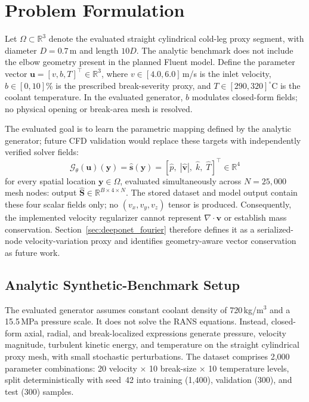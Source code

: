 \documentclass[journal]{IEEEtran}
\newcommand{\added}[1]{#1}
\begin{document}
\section{Problem Formulation}
\label{sec:problem}

\added{Let $\Omega \subset \mathbb{R}^3$ denote the evaluated straight cylindrical cold-leg proxy segment, with diameter $D = 0.7$\,m and length $10D$. The analytic benchmark does not include the elbow geometry present in the planned Fluent model.} Define the parameter vector $\bm{u} = [v, b, T]^\top \in \mathbb{R}^3$, where $v \in [4.0, 6.0]$\,m/s is the inlet velocity, $b \in [0, 10]$\% is the \added{prescribed break-severity proxy}, and $T \in [290, 320]^\circ$C is the coolant temperature. \added{In the evaluated generator, $b$ modulates closed-form fields; no physical opening or break-area mesh is resolved.}

\added{The evaluated goal is to learn the parametric mapping defined by the analytic generator; future CFD validation would replace these targets with independently verified solver fields:}
\begin{equation}
\mathcal{G}_\theta(\bm{u})(\bm{y}) = \hat{\bm{s}}(\bm{y}) = [\hat{p},\; |\hat{\bm{v}}|,\; \hat{k},\; \hat{T}]^\top \in \mathbb{R}^4
\label{eq:operator}
\end{equation}
for every spatial location $\bm{y} \in \Omega$, evaluated simultaneously across $N = 25{,}000$ mesh nodes: output $\hat{\bm{S}} \in \mathbb{R}^{B \times 4 \times N}$.  \added{The stored dataset and model output contain these four scalar fields only; no $(v_x,v_y,v_z)$ tensor is produced. Consequently, the implemented velocity regularizer cannot represent $\nabla\!\cdot\!\bm v$ or establish mass conservation. Section~\ref{sec:deeponet_fourier} therefore defines it as a serialized-node velocity-variation proxy and identifies geometry-aware vector conservation as future work.}

\subsection{Analytic Synthetic-Benchmark Setup}

\added{The evaluated generator assumes constant coolant density of 720\,kg/m$^3$ and a 15.5\,MPa pressure scale. It does not solve the RANS equations. Instead, closed-form axial, radial, and break-localized expressions generate pressure, velocity magnitude, turbulent kinetic energy, and temperature on the straight cylindrical proxy mesh, with small stochastic perturbations. The dataset comprises 2,000 parameter combinations: 20 velocity $\times$ 10 break-size $\times$ 10 temperature levels, split deterministically with seed~42 into training (1,400), validation (300), and test (300) samples.}
\end{document}
